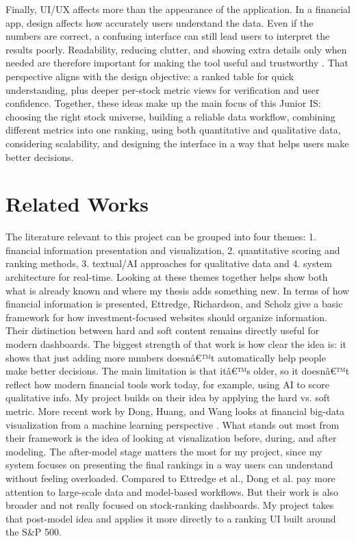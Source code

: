 \documentclass[12pt]{article}
\begin{document}
Finally, UI/UX affects more than the appearance of the application. In a financial app, design affects how accurately users understand the data. Even if the numbers are correct, a confusing interface can still lead users to interpret the results poorly. Readability, reducing clutter, and showing extra details only when needed are therefore important for making the tool useful and trustworthy \cite{runsewe2024optimizing}. That perspective aligns with the design objective: a ranked table for quick understanding, plus deeper per-stock metric views for verification and user confidence. Together, these ideas make up the main focus of this Junior IS: choosing the right stock universe, building a reliable data workflow, combining different metrics into one ranking, using both quantitative and qualitative data, considering scalability, and designing the interface in a way that helps users make better decisions.

\section{Related Works}
The literature relevant to this project can be grouped into four themes: 1. financial information presentation and visualization, 2. quantitative scoring and ranking methods, 3. textual/AI approaches for qualitative data and 4. system architecture for real-time. Looking at these themes together helps show both what is already known and where my thesis adds something new. In terms of how financial information is presented, Ettredge, Richardson, and Scholz give a basic framework for how investment-focused websites should organize information\cite{Ettredge2001WebDesign}. Their distinction between hard and soft content remains directly useful for modern dashboards. The biggest strength of that work is how clear the idea is: it shows that just adding more numbers doesnâ€™t automatically help people make better decisions. The main limitation is that itâ€™s older, so it doesnâ€™t reflect how modern financial tools work today, for example, using AI to score qualitative info. My project builds on their idea by applying the hard vs. soft metric. 
More recent work by Dong, Huang, and Wang looks at financial big-data visualization from a machine learning perspective \cite{Dong2024FinancialViz}. What stands out most from their framework is the idea of looking at visualization before, during, and after modeling. The after-model stage matters the most for my project, since my system focuses on presenting the final rankings in a way users can understand without feeling overloaded. Compared to Ettredge et al., Dong et al. pay more attention to large-scale data and model-based workflows. But their work is also broader and not really focused on stock-ranking dashboards. My project takes that post-model idea and applies it more directly to a ranking UI built around the S\&P 500.
\end{document}
